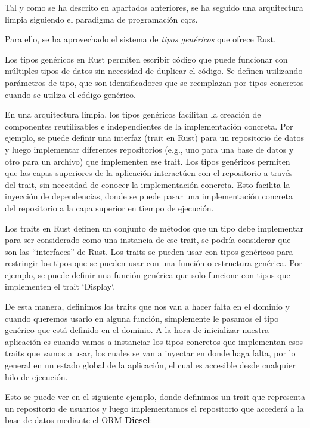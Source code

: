 Tal y como se ha descrito en apartados anteriores, se ha seguido una arquitectura limpia siguiendo el paradigma de programación \acrshort{cqrs}.

Para ello, se ha aprovechado el sistema de \textit{tipos genéricos} que ofrece Rust.

Los tipos genéricos en Rust permiten escribir código que puede funcionar con múltiples tipos de datos sin necesidad de duplicar el código. Se definen utilizando parámetros de tipo, que son identificadores que se reemplazan por tipos concretos cuando se utiliza el código genérico.

En una arquitectura limpia, los tipos genéricos facilitan la creación de componentes reutilizables e independientes de la implementación concreta. Por ejemplo, se puede definir una interfaz (trait en Rust) para un repositorio de datos y luego implementar diferentes repositorios (e.g., uno para una base de datos y otro para un archivo) que implementen ese trait. Los tipos genéricos permiten que las capas superiores de la aplicación interactúen con el repositorio a través del trait, sin necesidad de conocer la implementación concreta. Esto facilita la inyección de dependencias, donde se puede pasar una implementación concreta del repositorio a la capa superior en tiempo de ejecución.

Los traits en Rust definen un conjunto de métodos que un tipo debe implementar para ser considerado como una instancia de ese trait, se podría considerar que son las ``interfaces'' de Rust. Los traits se pueden usar con tipos genéricos para restringir los tipos que se pueden usar con una función o estructura genérica. Por ejemplo, se puede definir una función genérica que solo funcione con tipos que implementen el trait `Display`.

De esta manera, definimos los traits que nos van a hacer falta en el dominio y cuando queremos usarlo en alguna función, simplemente le pasamos el tipo genérico que está definido en el dominio.
A la hora de inicializar nuestra aplicación es cuando vamos a instanciar los tipos concretos que implementan esos traits que vamos a usar, los cuales se van a inyectar en donde haga falta, por lo general en un estado global de la aplicación, el cual es accesible desde cualquier hilo de ejecución.

Esto se puede ver en el siguiente ejemplo, donde definimos un trait que representa un repositorio de usuarios y luego implementamos el repositorio que accederá a la base de datos mediante el ORM \textbf{Diesel}:

